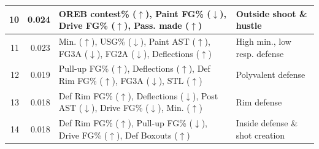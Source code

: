 \begin{tabular}{rrll}
\midrule
10 & 0.024 & OREB contest\% ($\uparrow$), Paint FG\% ($\downarrow$), Drive FG\% ($\uparrow$), Pass. made ($\uparrow$) & Outside shoot \& hustle \\ 
\midrule
11 & 0.023 & Min. ($\uparrow$), USG\% ($\downarrow$), Paint AST ($\uparrow$), FG3A ($\downarrow$), FG2A ($\downarrow$), Deflections ($\uparrow$) & High min., low resp. defense \\ 
\midrule
12 & 0.019 & Pull-up FG\% ($\uparrow$), Deflections ($\uparrow$), Def Rim FG\% ($\uparrow$), FG3A ($\downarrow$), STL ($\uparrow$) & Polyvalent defense \\ 
\midrule
13 & 0.018 & Def Rim FG\% ($\uparrow$), Deflections ($\downarrow$), Post AST ($\downarrow$), Drive FG\% ($\downarrow$), Min. ($\uparrow$) & Rim defense \\ 
\midrule
14 & 0.018 & Def Rim FG\% ($\uparrow$), Pull-up FG\% ($\downarrow$), Drive FG\% ($\uparrow$), Def Boxouts ($\uparrow$) & Inside defense \& shot creation \\ 
\bottomrule
\end{tabular}
